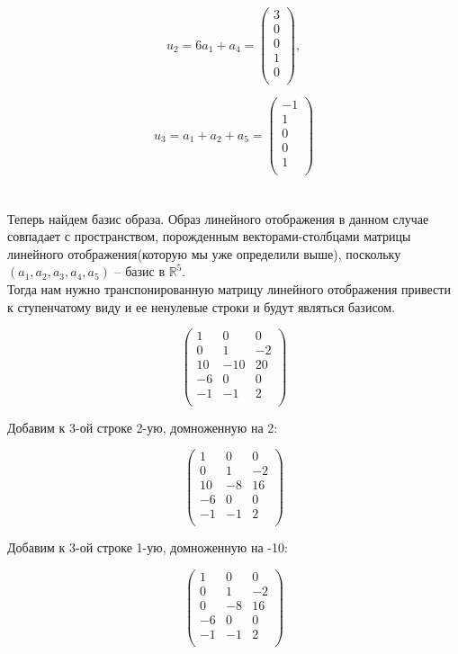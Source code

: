 	\[u_2 = 6a_1 + a_4 =  
	\begin{pmatrix}
	3 \\
	0  \\
	0 \\
	1 \\
	0 \\
	\end{pmatrix},\]
	
	\[u_3 = a_1 + a_2 + a_5 =  
	\begin{pmatrix}
	-1 \\
	1 \\
	0 \\
	0 \\
	1  \\
	\end{pmatrix}
	\] \\\\
	
	Теперь найдем базис образа. Образ линейного отображения  в данном случае совпадает с пространством, порожденным векторами-столбцами матрицы линейного отображения(которую мы уже определили выше), поскольку $(a_1, a_2, a_3, a_4, a_5)$ -- базис в $\mathbb{R}^5$.\\
	Тогда нам нужно транспонированную матрицу линейного отображения привести к ступенчатому виду и ее ненулевые строки и будут являться базисом. 
	
	\[
	\begin{pmatrix}
	1 & 0 & 0 \\
	0 & 1 & -2 \\
	10 & -10 & 20 \\
	-6 & 0 & 0 \\
	-1 & -1 & 2 \\
	\end{pmatrix}
	\]
	
	Добавим к 3-ой строке 2-ую, домноженную на 2:
	
	\[
	\begin{pmatrix}
	1 & 0 & 0 \\
	0 & 1 & -2 \\
	10 & -8 & 16 \\
	-6 & 0 & 0 \\
	-1 & -1 & 2 \\
	\end{pmatrix}
	\]
	
	Добавим к 3-ой строке 1-ую, домноженную на -10:
	
	\[
	\begin{pmatrix}
	1 & 0 & 0 \\
	0 & 1 & -2 \\
	0 & -8 & 16 \\
	-6 & 0 & 0 \\
	-1 & -1 & 2 \\
	\end{pmatrix}
	\]
	
